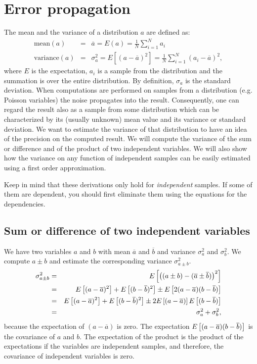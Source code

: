\newpage
\section{Error propagation \label{app:error}}
The mean and the variance of a distribution $a$ are defined as:
\begin{eqnarray}
  \mbox{mean}(a) & = & \overline{a} = E(a) = \frac{1}{N} \sum_{i=1}^N a_i\\
  \mbox{variance}(a) & = & \sigma_a^2 = E\left[ (a - \overline{a})^2 \right]
   = \frac{1}{N} \sum_{i=1}^N (a_i - \overline{a})^2,
\end{eqnarray}
where $E$ is the expectation, $a_i$ is a sample from the distribution and the
summation is over the entire distribution. By definition, $\sigma_a$ is the
standard deviation. When computations are performed on samples from a
distribution (e.g. Poisson variables) the noise propagates into the
result. Consequently, one can regard the result also as a sample from some
distribution which can be characterized by its (usually unknown) mean value
and its variance or standard deviation. We want to estimate the variance of
that distribution to have an idea of the precision on the computed result. We
will compute the variance of the sum or difference and of the product of two
independent variables. We will also show how the variance on any function of
independent samples can be easily estimated using a first order approximation.

Keep in mind that these derivations only hold for {\em independent}
samples. If some of them are dependent, you should first eliminate them using
the equations for the dependencies.

\subsection{Sum or difference of two independent variables}
We have two variables $a$ and $b$ with mean $\overline{a}$ and $\overline{b}$
and variance $\sigma_a^2$ and $\sigma_b^2$. We compute $a \pm b$ and estimate
the corresponding variance $\sigma_{a \pm b}^2$.
\begin{eqnarray}
\sigma_{a \pm b}^2 & = & E\left[{\left((a \pm b) - (\overline{a} \pm \overline{b}) \right)^2}\right]
           \nonumber\\
 & = & E\left[{(a-\overline{a})^2}\right] + E\left[{(b-\overline{b})^2}\right] \pm E\left[{2(a-\overline{a})(b-\overline{b})}\right]
           \nonumber\\
 & = & E\left[{(a-\overline{a})^2}\right] + E\left[{(b-\overline{b})^2}\right] \pm 2 E\left[{(a-\overline{a})}\right]E\left[{(b-\overline{b})}\right]
           \nonumber\\
 & = & \sigma_a^2 + \sigma_b^2, \label{eq:app_sumerror}
\end{eqnarray}
because the expectation of $(a - \overline{a})$ is zero. The expectation
$E\left[{(a-\overline{a})(b-\overline{b})}\right]$ is the covariance of $a$ and $b$. The
expectation of the product is the product of the expectations if the
variables are independent samples, and therefore, the covariance of
independent variables is zero.

